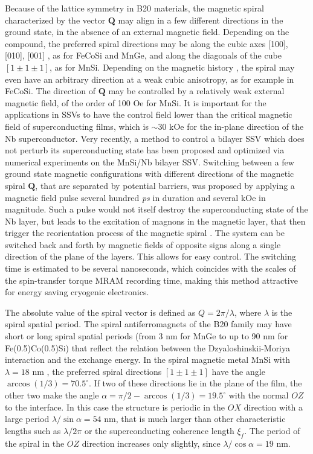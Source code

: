 \documentclass[prb,amsmath,amssymb,reprint]{revtex4-2}
\begin{document}
Because of the lattice symmetry in B20 materials, the magnetic spiral characterized by the vector $\mathbf{Q}$ may align in a few different directions in the ground state, in the absence of an external magnetic field.  Depending on the compound, the preferred spiral directions may be along the cubic axes [100], [010], [001] , as for FeCoSi and MnGe, and along the diagonals of the cube $[1\pm 1\pm 1]$, as for MnSi.
Depending on the magnetic history \cite{Dyadkin}, the spiral may even have an arbitrary direction at a weak cubic anisotropy, as for example in FeCoSi.
The direction of $\mathbf{Q}$ may be controlled by a relatively weak external
magnetic field, of the order of 100 Oe for MnSi.
It is important for the applications in SSVs to have the control field lower
than the critical magnetic field of superconducting films, which is $\sim
30$ kOe for the in-plane direction of the Nb superconductor.
Very recently, a method to control a bilayer SSV which does not perturb its superconducting state  has been proposed and optimized \cite{Gusev2021} via numerical experiments on the MnSi/Nb bilayer SSV.
Switching between a few ground state magnetic configurations  with different directions of the magnetic spiral $\mathbf{Q}$, that are separated by potential barriers,  was proposed  by applying a magnetic field pulse several hundred {\it ps} in duration and  several kOe in magnitude.
Such a pulse would not itself destroy the superconducting state of the Nb layer,  but leads to the excitation of magnons in the magnetic layer, that then trigger the reorientation process of the magnetic spiral  \cite{Gusev2021}. The system can be switched  back and forth by magnetic fields of opposite signs along a single  direction of  the plane of the layers. This allows for easy control. The switching time is estimated \cite{Gusev2021} to be several nanoseconds, which coincides with the scales of the spin-transfer torque MRAM recording time, making this method attractive
for energy saving cryogenic electronics.

The absolute value of the spiral vector is defined as $Q=2\pi /\lambda $, where $\lambda $ is the spiral spatial period. The spiral antiferromagnets of the B20 family may have short or long spiral spatial periods (from 3 nm for MnGe to up to 90 nm for Fe(0.5)Co(0.5)Si)  that reflect the relation between the Dzyaloshinskii-Moriya interaction and the exchange energy.
In the spiral magnetic metal MnSi with $\lambda=18$ nm , the preferred spiral
directions $[1 \pm1 \pm1]$ have the angle $\arccos (1/3)=70.5^{\circ }$. If
two of these directions lie in the plane of the film, the other two make the angle $\alpha =\pi/2-\arccos (1/3)=19.5^{\circ }$ with the normal $OZ$ to the
interface. In this case the structure is periodic in the $OX$ direction with a
large period $\lambda /\sin \alpha =54$ nm, that is much larger than other
characteristic lengths such as $\lambda /2\pi $ or the superconducting coherence length $\xi_f$. The period of the spiral in the $OZ$ direction increases only slightly, since $\lambda /\cos \alpha =19$ nm.
\end{document}
